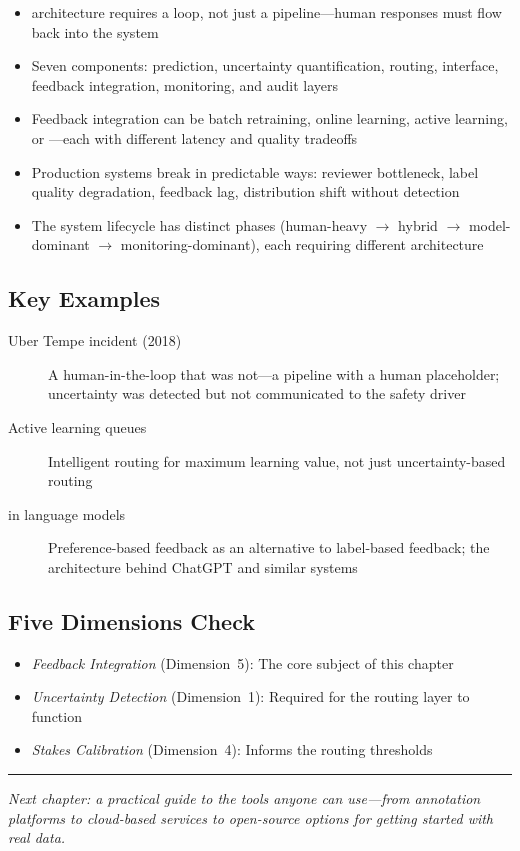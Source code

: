 \begin{keyconcept}
\begin{itemize}
  \item \hitl architecture requires a loop, not just a pipeline---human responses must flow back into the system
  \item Seven components: prediction, uncertainty quantification, routing, interface, feedback integration, monitoring, and audit layers
  \item Feedback integration can be batch retraining, online learning, active learning, or \rlhf---each with different latency and quality tradeoffs
  \item Production \hitl systems break in predictable ways: reviewer bottleneck, label quality degradation, feedback lag, distribution shift without detection
  \item The system lifecycle has distinct phases (human-heavy $\to$ hybrid $\to$ model-dominant $\to$ monitoring-dominant), each requiring different architecture
\end{itemize}
\end{keyconcept}

\subsection*{Key Examples}

\begin{description}
  \item[Uber Tempe incident (2018)] A human-in-the-loop that was not---a pipeline with a human placeholder; uncertainty was detected but not communicated to the safety driver
  \item[Active learning queues] Intelligent routing for maximum learning value, not just uncertainty-based routing
  \item[\rlhf in language models] Preference-based feedback as an alternative to label-based feedback; the architecture behind ChatGPT and similar systems
\end{description}

\subsection*{Five Dimensions Check}

\begin{itemize}
  \item \textit{Feedback Integration} (Dimension~5): The core subject of this chapter
  \item \textit{Uncertainty Detection} (Dimension~1): Required for the routing layer to function
  \item \textit{Stakes Calibration} (Dimension~4): Informs the routing thresholds
\end{itemize}

\bigskip
\begin{center}
\rule{0.5\textwidth}{0.4pt}
\end{center}
\bigskip

\noindent\textit{Next chapter: a practical guide to the tools anyone can use---from annotation platforms to cloud-based \hitl services to open-source options for getting started with real data.}
